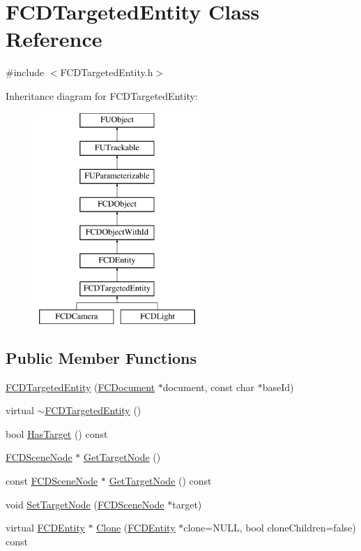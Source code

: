 \hypertarget{classFCDTargetedEntity}{
\section{FCDTargetedEntity Class Reference}
\label{classFCDTargetedEntity}
}


{\ttfamily \#include $<$FCDTargetedEntity.h$>$}

Inheritance diagram for FCDTargetedEntity:\begin{figure}[H]
\begin{center}
\leavevmode
\includegraphics[height=8.000000cm]{classFCDTargetedEntity}
\end{center}
\end{figure}
\subsection*{Public Member Functions}
\begin{DoxyCompactItemize}
\item 
\hyperlink{classFCDTargetedEntity_a1b8288f98ecd87c6d67c160fdbc84c8e}{FCDTargetedEntity} (\hyperlink{classFCDocument}{FCDocument} $\ast$document, const char $\ast$baseId)
\item 
virtual \hyperlink{classFCDTargetedEntity_af219ef0c612e1db887770ee173c4b0fc}{$\sim$FCDTargetedEntity} ()
\item 
bool \hyperlink{classFCDTargetedEntity_aa3b365694bdf46b5be98518607b66518}{HasTarget} () const 
\item 
\hyperlink{classFCDSceneNode}{FCDSceneNode} $\ast$ \hyperlink{classFCDTargetedEntity_a50896d5a2017ab08f63bb499e8c09343}{GetTargetNode} ()
\item 
const \hyperlink{classFCDSceneNode}{FCDSceneNode} $\ast$ \hyperlink{classFCDTargetedEntity_a9261ef2dc3b5d387fb62f52ea20efa21}{GetTargetNode} () const 
\item 
void \hyperlink{classFCDTargetedEntity_a297fa32e4899f799318e814645772a35}{SetTargetNode} (\hyperlink{classFCDSceneNode}{FCDSceneNode} $\ast$target)
\item 
virtual \hyperlink{classFCDEntity}{FCDEntity} $\ast$ \hyperlink{classFCDTargetedEntity_a58caa60f030e5eba714015adf54dbd54}{Clone} (\hyperlink{classFCDEntity}{FCDEntity} $\ast$clone=NULL, bool cloneChildren=false) const 
\end{DoxyCompactItemize}



